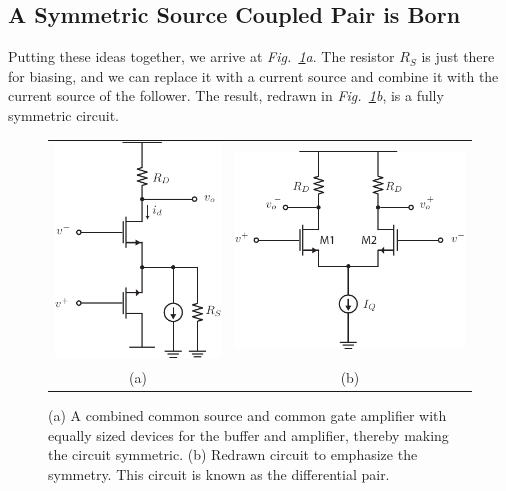 \subsection{A Symmetric Source Coupled Pair is Born}
Putting these ideas together, we arrive at \emph{Fig.~\ref{fig:amp_CS_CG_sym}a}.  The resistor $R_S$ is just there for biasing, and we can replace it with a current source and combine it with the current source of the follower.  The result, redrawn in \emph{Fig.~\ref{fig:amp_CS_CG_sym}b}, is a fully symmetric circuit.
\begin{figure}[H]
\centering
\begin{tabular}{cc}
\includegraphics[scale=1.25]{amp_CS_CG_sym} &
\includegraphics[scale=1.25]{amp_sym_pair}\\
(a) & (b)\\
\end{tabular}
\caption{(a) A combined common source and common gate amplifier with equally sized devices for the buffer and amplifier, thereby making the circuit symmetric.  (b) Redrawn circuit to emphasize the symmetry.  This circuit is known as the differential pair.}
\label{fig:amp_CS_CG_sym}
\end{figure}
